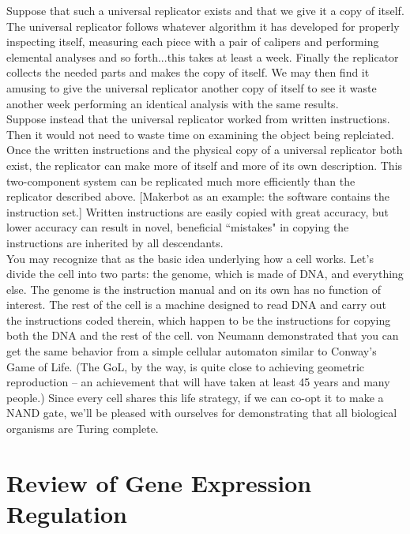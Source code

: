 \documentclass{article}
\begin{document}
Suppose that such a universal replicator exists and that we give it a copy of itself. The universal replicator follows whatever algorithm it has developed for properly inspecting itself, measuring each piece with a pair of calipers and performing elemental analyses and so forth...this takes at least a week. Finally the replicator collects the needed parts and makes the copy of itself. We may then find it amusing to give the universal replicator another copy of itself to see it waste another week performing an identical analysis with the same results.\\

Suppose instead that the universal replicator worked from written instructions. Then it would not need to waste time on examining the object being replciated. Once the written instructions and the physical copy of a universal replicator both exist, the replicator can make more of itself and more of its own description. This two-component system can be replicated much more efficiently than the replicator described above. [Makerbot as an example: the software contains the instruction set.] Written instructions are easily copied with great accuracy, but lower accuracy can result in novel, beneficial ``mistakes" in copying the instructions are inherited by all descendants. \\

You may recognize that as the basic idea underlying how a cell works. Let's divide the cell into two parts: the genome, which is made of DNA, and everything else. The genome is the instruction manual and on its own has no function of interest. The rest of the cell is a machine designed to read DNA and carry out the instructions coded therein, which happen to be the instructions for copying both the DNA and the rest of the cell. von Neumann demonstrated that you can get the same behavior from a simple cellular automaton similar to Conway's Game of Life. (The GoL, by the way, is quite close to achieving geometric reproduction -- an achievement that will have taken at least 45 years and many people.) Since every cell shares this life strategy, if we can co-opt it to make a NAND gate, we'll be pleased with ourselves for demonstrating that all biological organisms are Turing complete.

\section*{Review of Gene Expression Regulation}
\end{document}

